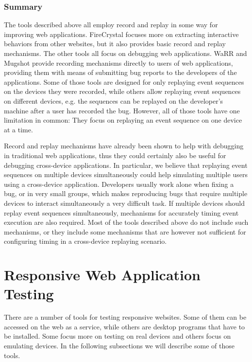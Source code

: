 \subsubsection{Summary}

The tools described above all employ record and replay in some way for improving web applications. FireCrystal focuses more on extracting interactive behaviors from other websites, but it also provides basic record and replay mechanisms. The other tools all focus on debugging web applications. WaRR and Mugshot provide recording mechanisms directly to users of web applications, providing them with means of submitting bug reports to the developers of the applications. Some of those tools are designed for only replaying event sequences on the devices they were recorded, while others allow replaying event sequences on different devices, e.g. the sequences can be replayed on the developer's machine after a user has recorded the bug. However, all of those tools have one limitation in common: They focus on replaying an event sequence on one device at a time. 

Record and replay mechanisms have already been shown to help with debugging in traditional web applications, thus they could certainly also be useful for debugging cross-device applications. In particular, we believe that replaying event sequences on multiple devices simultaneously could help simulating multiple users using a cross-device application. Developers usually work alone when fixing a bug, or in very small groups, which makes reproducing bugs that require multiple devices to interact simultaneously a very difficult task. If multiple devices should replay event sequences simultaneously, mechanisms for accurately timing event execution are also required. Most of the tools described above do not include such mechanisms, or they include some mechanisms that are however not sufficient for configuring timing in a cross-device replaying scenario.

\section{Responsive Web Application Testing}

There are a number of tools for testing responsive websites. Some of them can be accessed on the web as a service, while others are desktop programs that have to be installed. Some focus more on testing on real devices and others focus on emulating devices. In the following subsections we will describe some of those tools.

